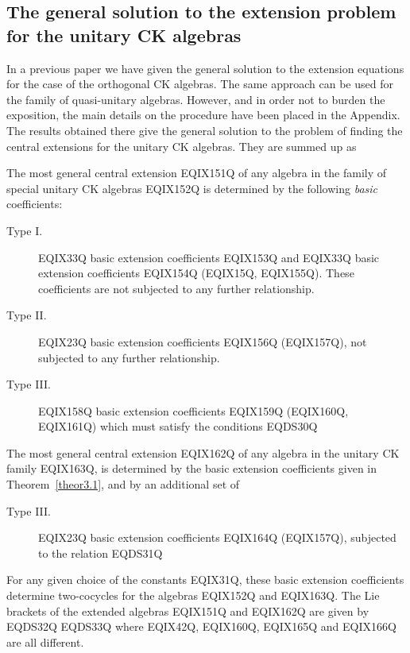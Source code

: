 \subsection{The  general solution to the extension problem for the
 unitary CK algebras}

In a previous paper \cite{Azc.Her.Bue.San:96}
we have given the general solution to
the extension equations for the case of the  orthogonal CK algebras.
The same approach can be used for the   family of
quasi-unitary algebras. However, and in order not to burden the
exposition, the main details on the procedure have been placed in the Appendix.
The results obtained there give the  general solution to the problem of
finding the central extensions for the unitary CK
algebras. They are summed up as

\begin{theorem}
\label{theor3.1}
The most general central extension EQIX151Q of
any algebra in the family of special unitary CK algebras
EQIX152Q is determined by the following \emph{basic}
coefficients:
\begin{description}
\item[Type I.]
EQIX33Q basic extension coefficients EQIX153Q and
EQIX33Q basic extension coefficients EQIX154Q  (EQIX15Q,
EQIX155Q). These coefficients are not subjected to any
further relationship.

\item[Type II.] EQIX23Q basic extension coefficients EQIX156Q
(EQIX157Q), not subjected to any further relationship.

\item[Type III.] EQIX158Q basic extension coefficients EQIX159Q
(EQIX160Q, EQIX161Q) which must satisfy the conditions
EQDS30Q
\end{description}
\end{theorem}

\begin{theorem}
\label{theor3.2}
The most general central extension EQIX162Q of
any algebra in the unitary CK family
EQIX163Q, is determined by the basic extension
coefficients given in Theorem~\ref{theor3.1}, and by an additional set of

\begin{description}
\item[Type III.]
EQIX23Q basic extension coefficients EQIX164Q
(EQIX157Q), subjected to the relation
EQDS31Q
\end{description}
\end{theorem}
For any given choice of the constants EQIX31Q, these basic extension
coefficients determine two-cocycles for the algebras
EQIX152Q and
EQIX163Q. The Lie brackets of the extended algebras
EQIX151Q and EQIX162Q are
given by
EQDS32Q
EQDS33Q
where EQIX42Q, EQIX160Q, EQIX165Q  and EQIX166Q are all different.

